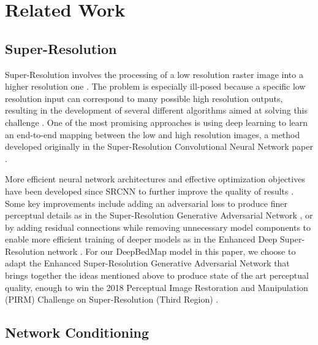\documentclass[tc, manuscript]{copernicus}
\begin{document}
\section{Related Work}

\subsection{Super-Resolution}

Super-Resolution involves the processing of a low resolution raster image into a higher resolution one \citep{TsaiMultiframeimagerestoration1984}.
The problem is especially ill-posed because a specific low resolution input can correspond to many possible high resolution outputs, resulting in the development of several different algorithms aimed at solving this challenge \citep[see][for a review]{NasrollahiSuperresolutioncomprehensivesurvey2014}.
One of the most promising approaches is using deep learning \citep{LeCunDeeplearning2015} to learn an end-to-end mapping between the low and high resolution images, a method developed originally in the Super-Resolution Convolutional Neural Network paper \citep[SRCNN,][]{DongImageSuperResolutionUsing2014}.

More efficient neural network architectures and effective optimization objectives have been developed since SRCNN to further improve the quality of results \cite[see][for a review]{YangDeepLearningSingle2018}.
Some key improvements include adding an adversarial loss \citep{GoodfellowGenerativeAdversarialNetworks2014} to produce finer perceptual details as in the Super-Resolution Generative Adversarial Network \citep[SRGAN,][]{LedigPhotoRealisticSingleImage2016}, or by adding residual connections while removing unnecessary model components to enable more efficient training of deeper models as in the Enhanced Deep Super-Resolution network \citep[EDSR,][]{LimEnhancedDeepResidual2017}.
For our DeepBedMap model in this paper, we choose to adapt the Enhanced Super-Resolution Generative Adversarial Network \citep[ESRGAN,][]{WangESRGANEnhancedSuperResolution2018} that brings together the ideas mentioned above to produce state of the art perceptual quality, enough to win the 2018 Perceptual Image Restoration and Manipulation (PIRM) Challenge on Super-Resolution (Third Region) \citep{Blau2018PIRMChallenge2018}.

\subsection{Network Conditioning}
\end{document}
